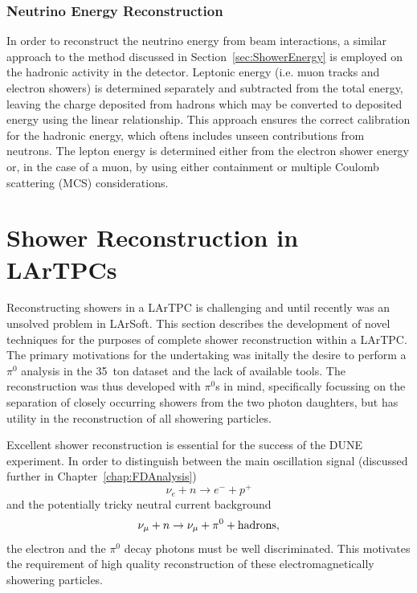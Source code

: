\subsubsection{Neutrino Energy Reconstruction}\label{sec:NeutrinoEnergy}

In order to reconstruct the neutrino energy from beam interactions, a similar approach to the method discussed in Section~\ref{sec:ShowerEnergy} is employed on the hadronic activity in the detector.  Leptonic energy (i.e. muon tracks and electron showers) is determined separately and subtracted from the total energy, leaving the charge deposited from hadrons which may be converted to deposited energy using the linear relationship.  This approach ensures the correct calibration for the hadronic energy, which oftens includes unseen contributions from neutrons.  The lepton energy is determined either from the electron shower energy or, in the case of a muon, by using either containment or multiple Coulomb scattering (MCS) considerations.

\section{Shower Reconstruction in LArTPCs}\label{sec:ShowerReconstruction}

Reconstructing showers in a LArTPC is challenging and until recently was an unsolved problem in LArSoft.  This section describes the development of novel techniques for the purposes of complete shower reconstruction within a LArTPC.  The primary motivations for the undertaking was initally the desire to perform a $\pi^0$ analysis in the 35~ton dataset and the lack of available tools.  The reconstruction was thus developed with $\pi^0$s in mind, specifically focussing on the separation of closely occurring showers from the two photon daughters, but has utility in the reconstruction of all showering particles.

Excellent shower reconstruction is essential for the success of the DUNE experiment.  In order to distinguish between the main oscillation signal (discussed further in Chapter~\ref{chap:FDAnalysis})
\begin{equation}
  \nu_e + n \rightarrow e^- + p^+
\end{equation}
and the potentially tricky neutral current background
\begin{equation}
  \nu_{\mu} + n \rightarrow \nu_{\mu} + \pi^0 + \textnormal{hadrons},
\end{equation}
the electron and the $\pi^0$ decay photons must be well discriminated.  This motivates the requirement of high quality reconstruction of these electromagnetically showering particles.

